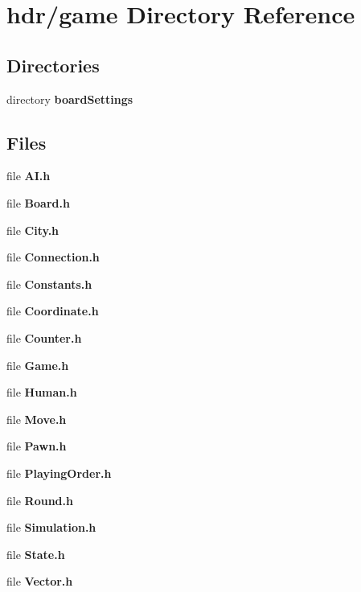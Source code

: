 \section{hdr/game Directory Reference}
\label{dir_f9ac9697e996c45f503885d8d672ac41}
\subsection*{Directories}
\begin{DoxyCompactItemize}
\item 
directory {\bf board\-Settings}
\end{DoxyCompactItemize}
\subsection*{Files}
\begin{DoxyCompactItemize}
\item 
file {\bfseries A\-I.\-h}
\item 
file {\bfseries Board.\-h}
\item 
file {\bfseries City.\-h}
\item 
file {\bfseries Connection.\-h}
\item 
file {\bfseries Constants.\-h}
\item 
file {\bfseries Coordinate.\-h}
\item 
file {\bfseries Counter.\-h}
\item 
file {\bfseries Game.\-h}
\item 
file {\bfseries Human.\-h}
\item 
file {\bfseries Move.\-h}
\item 
file {\bfseries Pawn.\-h}
\item 
file {\bfseries Playing\-Order.\-h}
\item 
file {\bfseries Round.\-h}
\item 
file {\bfseries Simulation.\-h}
\item 
file {\bfseries State.\-h}
\item 
file {\bfseries Vector.\-h}
\end{DoxyCompactItemize}
